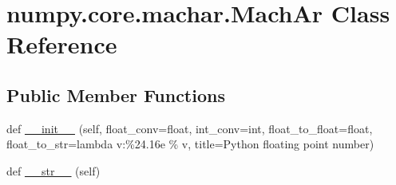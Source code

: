 \hypertarget{classnumpy_1_1core_1_1machar_1_1MachAr}{}\section{numpy.\+core.\+machar.\+Mach\+Ar Class Reference}
\label{classnumpy_1_1core_1_1machar_1_1MachAr}
\subsection*{Public Member Functions}
\begin{DoxyCompactItemize}
\item 
def \hyperlink{classnumpy_1_1core_1_1machar_1_1MachAr_ad3f3270ef2fb030daff0eb2d62035b9c}{\+\_\+\+\_\+init\+\_\+\+\_\+} (self, float\+\_\+conv=float, int\+\_\+conv=int, float\+\_\+to\+\_\+float=float, float\+\_\+to\+\_\+str=lambda v\+:\textquotesingle{}\%24.\+16e\textquotesingle{} \% v, title=\textquotesingle{}\+Python floating point number\textquotesingle{})
\item 
def \hyperlink{classnumpy_1_1core_1_1machar_1_1MachAr_ae44e82521e9853322f77dfd256ca2a1f}{\+\_\+\+\_\+str\+\_\+\+\_\+} (self)
\end{DoxyCompactItemize}
